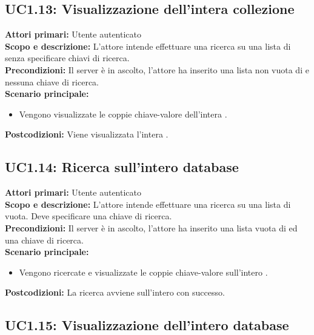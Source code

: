 \documentclass{scalatekids-article}
\begin{document}
\subsection{UC1.13: Visualizzazione dell'intera collezione}

\textbf{Attori primari:} Utente autenticato\\
\textbf{Scopo e descrizione:} L'attore intende effettuare una ricerca su una lista di  senza specificare chiavi di ricerca.\\
\textbf{Precondizioni:} Il server è in ascolto, l'attore ha inserito una lista non vuota di  e nessuna chiave di ricerca.\\
\textbf{Scenario principale:}
\begin{itemize}
\item Vengono visualizzate le coppie chiave-valore dell'intera .
\end{itemize}
\textbf{Postcodizioni:} Viene visualizzata l'intera .

\subsection{UC1.14: Ricerca sull'intero database}

\textbf{Attori primari:} Utente autenticato\\
\textbf{Scopo e descrizione:} L'attore intende effettuare una ricerca su una lista di  vuota. Deve specificare una chiave di ricerca.\\
\textbf{Precondizioni:} Il server è in ascolto, l'attore ha inserito una lista vuota di  ed una chiave di ricerca.\\
\textbf{Scenario principale:}
\begin{itemize}
\item Vengono ricercate e visualizzate le coppie chiave-valore sull'intero .
\end{itemize}
\textbf{Postcodizioni:} La ricerca avviene sull'intero  con successo.

\subsection{UC1.15: Visualizzazione dell'intero database}
\end{document}
